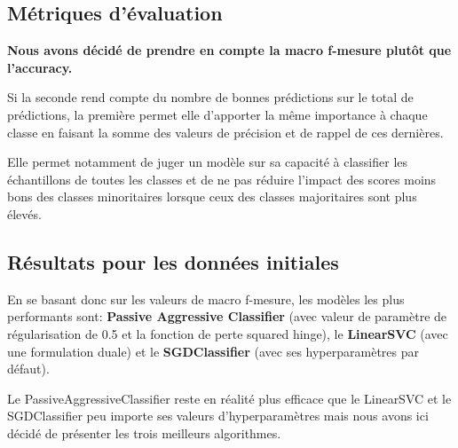 \documentclass[11pt]{article}
\begin{document}
\subsection{Métriques d'évaluation}

\textbf{Nous avons décidé de prendre en compte la macro f-mesure plutôt que l'accuracy.} 

Si la seconde rend compte du nombre de bonnes prédictions sur le total de prédictions, la première permet elle d'apporter la même importance à chaque classe en faisant la somme des valeurs de précision et de rappel de ces dernières. 

Elle permet notamment de juger un modèle sur sa capacité à classifier les échantillons de toutes les classes et de ne pas réduire l'impact des scores moins bons des classes minoritaires lorsque ceux des classes majoritaires sont plus élevés.

\subsection{Résultats pour les données initiales}

\begin{table}[ht]
\centering
{}
\caption{Meilleurs résultats obtenus sur les données initiales.}
\label{tab:pourcentage_test}
\end{table}

En se basant donc sur les valeurs de macro f-mesure, les modèles les plus performants sont: \textbf{Passive Aggressive Classifier} (avec valeur de paramètre de régularisation de 0.5 et la fonction de perte squared hinge), le \textbf{LinearSVC} (avec une formulation duale) et le \textbf{SGDClassifier} (avec ses hyperparamètres par défaut).

Le PassiveAggressiveClassifier reste en réalité plus efficace que le LinearSVC et le SGDClassifier peu importe ses valeurs d'hyperparamètres mais nous avons ici décidé de présenter les trois meilleurs algorithmes. 
\end{document}
